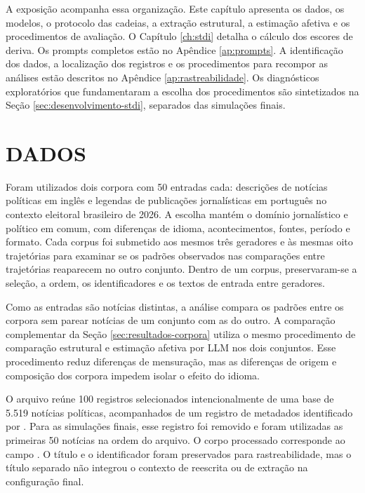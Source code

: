 A exposição acompanha essa organização. Este capítulo apresenta os dados, os modelos, o protocolo das cadeias, a extração estrutural, a estimação afetiva e os procedimentos de avaliação. O Capítulo \ref{ch:stdi} detalha o cálculo dos escores de deriva. Os prompts completos estão no Apêndice \ref{ap:prompts}. A identificação dos dados, a localização dos registros e os procedimentos para recompor as análises estão descritos no Apêndice \ref{ap:rastreabilidade}. Os diagnósticos exploratórios que fundamentaram a escolha dos procedimentos são sintetizados na Seção \ref{sec:desenvolvimento-stdi}, separados das simulações finais.

\section{DADOS}
\label{sec:metodos-dados}

Foram utilizados dois corpora com 50 entradas cada: descrições de notícias políticas em inglês e legendas de publicações jornalísticas em português no contexto eleitoral brasileiro de 2026. A escolha mantém o domínio jornalístico e político em comum, com diferenças de idioma, acontecimentos, fontes, período e formato. Cada corpus foi submetido aos mesmos três geradores e às mesmas oito trajetórias para examinar se os padrões observados nas comparações entre trajetórias reaparecem no outro conjunto. Dentro de um corpus, preservaram-se a seleção, a ordem, os identificadores e os textos de entrada entre geradores.

Como as entradas são notícias distintas, a análise compara os padrões entre os corpora sem parear notícias de um conjunto com as do outro. A comparação complementar da Seção \ref{sec:resultados-corpora} utiliza o mesmo procedimento de comparação estrutural e estimação afetiva por LLM nos dois conjuntos. Esse procedimento reduz diferenças de mensuração, mas as diferenças de origem e composição dos corpora impedem isolar o efeito do idioma.

O arquivo  reúne 100 registros selecionados intencionalmente de uma base de 5.519 notícias políticas, acompanhados de um registro de metadados identificado por . Para as simulações finais, esse registro foi removido e foram utilizadas as primeiras 50 notícias na ordem do arquivo. O corpo processado corresponde ao campo . O título e o identificador foram preservados para rastreabilidade, mas o título separado não integrou o contexto de reescrita ou de extração na configuração final.

